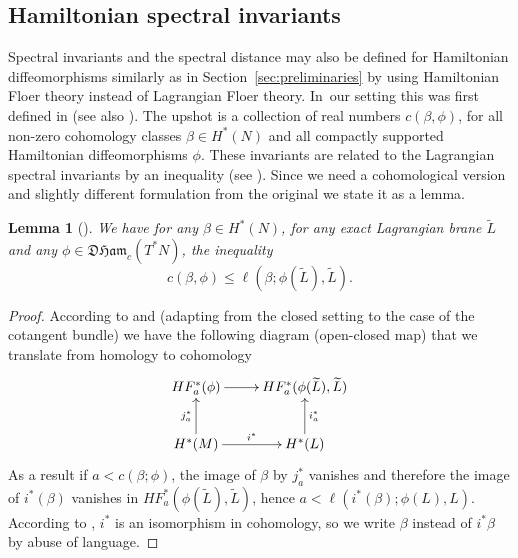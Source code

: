 \documentclass[10pt,a4paper]{amsart}
\newtheorem{lem}[thm]{Lemma}
\theoremstyle{definition}
\newcommand{\DHam}{\mathfrak{DHam}}
\begin{document}
\subsection{Hamiltonian spectral invariants}\label{sec:Hamiltonian-spectral-invariants}

Spectral invariants and the spectral distance may also be defined for Hamiltonian diffeomorphisms similarly as in Section~\ref{sec:preliminaries} by using Hamiltonian Floer theory instead of Lagrangian Floer theory. In~our setting this was first defined in \cite{Frauenfelder-Schlenk} (see also \cite{Lanzat}). The upshot is a collection of real numbers $c(\beta, \phi)$, for all non-zero cohomology classes $\beta\in H^*(N)$ and all compactly supported Hamiltonian diffeomorphisms $\phi$. These invariants are related to the Lagrangian spectral invariants by an inequality (see \cite[Prop.\,2.14]{M-V-Z}). Since we need a cohomological version and slightly different formulation from the original we state it as a lemma.

\begin{lem}[\cite{M-V-Z}]
We have for any $\beta \in H^*(N)$, for any exact Lagrangian brane $\tilde L$ and any $\phi\in\DHam_c(T^*N)$, the inequality
\begin{equation}\label{eq:Lagrangian-Hamiltonian-spectral-invariants}
c(\beta, \phi)\leq \ell(\beta;\phi(\tilde L), \tilde L).
\end{equation}
\end{lem}

\begin{proof}
According to \cite[Th.\,1.5]{Albers-PSS} and \cite[Proof of Prop.\,2.9]{M-V-Z} (adapting from the closed setting to the case of the cotangent bundle) we have the following diagram (open-closed map) that we translate from homology to cohomology
\[
\xymatrix{HF_{a}^*(\phi)\ar[r]& HF_{a}^*(\phi(\widetilde L),\widetilde L)\\
H^*(M)\ar[u]^{j^*_a} \ar[r]^-{i^*} & H^*(L)\ar[u]_{i^*_a}
}
\]
As a result if $a< c(\beta;\phi)$, the image of $\beta$ by $j_a^*$ vanishes and therefore the image of $i^*(\beta)$
vanishes in $HF_{a}^*(\phi(\widetilde{L}),\widetilde{L})$, hence $a < \ell (i^*(\beta);\phi(L),L)$. According to \cite{Fukaya-Seidel-Smith, Kragh2}, $i^*$ is an isomorphism in cohomology, so we write $\beta$ instead of $i^*\beta$ by abuse of language.
\end{proof}
\end{document}
